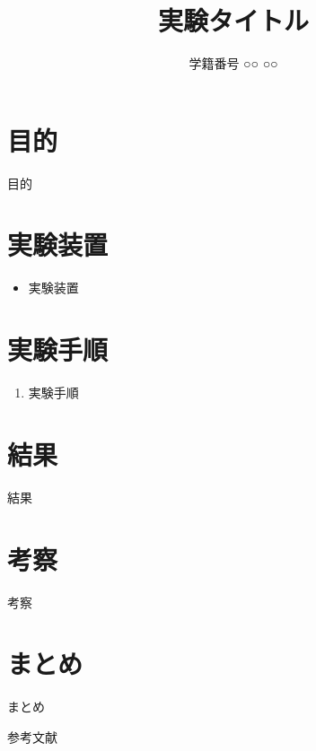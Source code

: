 \documentclass[dvipdfmx,autodetect-engine]{jsarticle}
\title{実験タイトル}
\author{学籍番号 ○○ ○○}
\begin{document}
\maketitle
\thispagestyle{empty}
\newpage

\section{目的}
目的

\section{実験装置}
\begin{itemize}
    \item 実験装置
\end{itemize}

\section{実験手順}
\begin{enumerate}
    \item 実験手順
\end{enumerate}

\section{結果}
結果

\section{考察}
考察

\section{まとめ}
まとめ

\begin{thebibliography}{99} %
 参考文献
\end{thebibliography}





\end{document}
